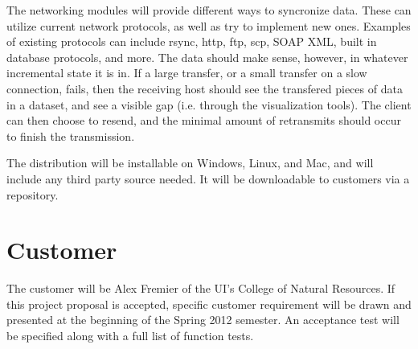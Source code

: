 The networking modules will provide different ways to syncronize data. These
can utilize current network protocols, as well as try to implement new
ones. Examples of existing protocols can include rsync, http, ftp, scp, SOAP
XML, built in database protocols, and more. The data should make sense, however,
in whatever incremental state it is in. If a large transfer, or a small
transfer on a slow connection, fails, then the receiving host should see the
transfered pieces of data in a dataset, and see a visible gap (i.e. through
the visualization tools). The client can then choose to resend, and the minimal
amount of retransmits should occur to finish the transmission.

The distribution will be installable on Windows, 
Linux, and Mac, and will include any third party source needed. It will be 
downloadable to customers via a repository. 

\section{Customer}
The customer will be Alex Fremier of the UI's College of Natural Resources.
If this project proposal is accepted, specific customer requirement will be 
drawn and presented at the beginning of the Spring 2012 semester. An 
acceptance test will be specified along with a full list of function tests.








